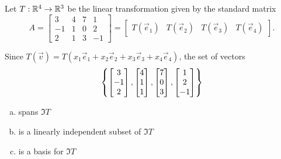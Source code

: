 \begin{activity}{5}
Let \(T: \mathbb{R}^4 \rightarrow \mathbb{R}^3\) be the linear transformation given by the
standard matrix
\[
  A
    =
  \begin{bmatrix} 3 & 4 & 7 & 1\\ -1 & 1 & 0 & 2 \\ 2 & 1 & 3 & -1 \end{bmatrix}
    =
  \begin{bmatrix}T(\vec e_1)&T(\vec e_2)&T(\vec e_3)&T(\vec e_4)\end{bmatrix}
.\]

Since \(T(\vec v)=T(x_1\vec e_1+x_2\vec e_2+x_3\vec e_3+x_4\vec e_4)\),
the set of vectors
\[
  \left\{
    \begin{bmatrix}3\\-1\\2\end{bmatrix},
    \begin{bmatrix}4\\1\\1\end{bmatrix},
    \begin{bmatrix}7\\0\\3\end{bmatrix},
    \begin{bmatrix}1\\2\\-1\end{bmatrix}
  \right\}
\]
\begin{enumerate}[a)]
\item spans \(\Im T\)
\item is a linearly independent subset of \(\Im T\)
\item is a basis for \(\Im T\)
\end{enumerate}
\end{activity}


